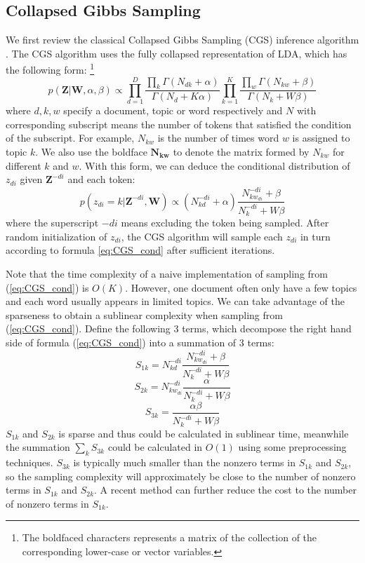 \documentclass{article} %
\begin{document}
\subsection{Collapsed Gibbs Sampling}
We first review the classical Collapsed Gibbs Sampling (CGS) inference algorithm \cite{griffiths2004finding}. The CGS algorithm uses the fully collapsed representation of LDA, which has the following form: \footnote{The boldfaced characters represents a matrix of the collection of the corresponding lower-case or vector variables. }
\[
p(\bm{Z}|\bm{W},\alpha,\beta) \propto  
\prod_{d=1}^{D} \frac{\prod_{k}\Gamma (N_{dk}+\alpha)}{\Gamma (N_d+K\alpha)}
\prod_{k=1}^{K} \frac{\prod_{w}\Gamma(N_{kw}+\beta)}{\Gamma(N_k+W\beta)}
\]
where $d,k,w$ specify a document, topic or word respectively and $N$ with corresponding subscript means the number of tokens that satisfied the condition of the subscript. For example, $N_{kw}$ is the number of times word $w$ is assigned to topic $k$. We also use the boldface $\bm{N_{kw}}$ to denote the matrix formed by $N_{kw}$ for different $k$ and $w$. With this form, we can deduce the conditional distribution of $z_{di}$ given $\bm{Z}^{-di}$ and each token:
\begin{equation}
p(z_{di}=k|\bm{Z}^{-di},\bm{W})\propto(N_{kd}^{-di}+\alpha) \frac{N_{kw_{di}}^{-di}+\beta}{N_k^{-di}+W\beta}
\label{eq:CGS_cond}
\end{equation}
where the superscript $-di$ means excluding the token being sampled. After random initialization of $z_{di}$, the CGS algorithm will sample each $z_{di}$ in turn according to formula \ref{eq:CGS_cond} after sufficient iterations. 

Note that the time complexity of a naive implementation of sampling from (\ref{eq:CGS_cond}) is $O(K)$. However, one document often only have a few topics and each word usually appears in limited topics. We can take advantage of the sparseness to obtain a sublinear complexity when sampling from (\ref{eq:CGS_cond}). Define the following 3 terms, which decompose the right hand side of formula (\ref{eq:CGS_cond}) into a summation of 3 terms:
$$S_{1k}=N_{kd}^{-di} \frac{N_{kw_{di}}^{-di}+\beta}{N_k^{-di}+W\beta}$$
$$S_{2k}=N_{kw_{di}}^{-di} \frac{\alpha}{N_k^{-di}+W\beta}$$
$$S_{3k}=\frac{\alpha\beta}{N_k^{-di}+W\beta}$$
$S_{1k}$ and $S_{2k}$ is sparse and thus could be calculated in sublinear time, meanwhile the summation $\sum_k S_{3k}$ could be calculated in $O(1)$ using some preprocessing techniques. $S_{3k}$ is typically much smaller than the nonzero terms in $S_{1k}$ and $S_{2k}$, so the sampling complexity will approximately be close to the number of nonzero terms in $S_{1k}$ and $S_{2k}$. A recent method \cite{aaron2014reducing} can further reduce the cost to the number of nonzero terms in $S_{1k}$.
\end{document}

